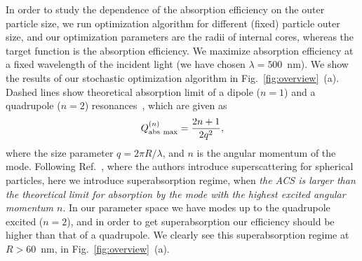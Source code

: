 \documentclass[aps,prl,twocolumn,showpacs,superscriptaddress,groupedaddress]{revtex4-1}  %
\begin{document}
\begin{figure}
\end{figure}
%
In order to study the dependence of the absorption efficiency on the
outer particle size, we run optimization algorithm for different
(fixed) particle outer size, and our optimization parameters are the
radii of internal cores, whereas the target function is the absorption
efficiency. We maximize absorption efficiency at a fixed wavelength of
the incident light (we have chosen $\lambda=500$~nm). We show the
results of our stochastic optimization algorithm in
Fig.~\ref{fig:overview}~(a).  Dashed lines show theoretical absorption
limit of a dipole ($n=1$) and a quadrupole ($n=2$)
resonances~\cite{Tribelsky-2011}, which are given as $$Q^{(n)}_{\rm
  abs\ max}=\frac{2n+1}{2q^2},$$ where the size parameter $q=2\pi
R/\lambda$, and $n$ is the angular momentum of the mode. Following
Ref.~\cite{Fan-2011}, where the authors introduce superscattering for
spherical particles, here we introduce superabsorption regime, when
{\em the ACS is larger than the theoretical limit for absorption by
  the mode with the highest excited angular momentum $n$}. In our
parameter space we have modes up to the quadrupole excited
($n=2$), and in order to get superabsorption our efficiency should be
higher than that of a quadrupole. We clearly see this superabsorption
regime at $R>60$~nm, in Fig.~\ref{fig:overview}~(a).
\end{document}
